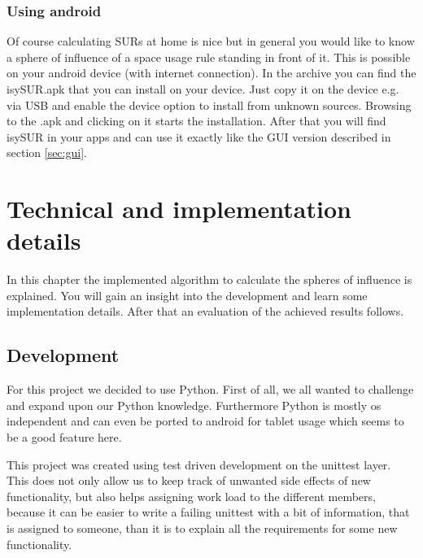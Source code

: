 \documentclass[11pt,fleqn]{book} %
\newcommand{\todol}{\todo[inline]} %
\begin{document}
\subsection{Using android}\label{sec:android}
Of course calculating SURs at home is nice but in general you would like to know a sphere of influence of a space usage rule standing in front of it. This is possible on your android device (with internet connection). In the archive you can find the isySUR.apk that you can install on your device. Just copy it on the device e.g. via USB and enable the device option to install from unknown sources. Browsing to the .apk and clicking on it starts the installation. After that you will find isySUR in your apps and can use it exactly like the GUI version described in section \ref{sec:gui}.


\chapter{Technical and implementation details}
In this chapter the implemented algorithm to calculate the spheres of influence is explained. You will gain an insight into the development and learn some implementation details. After that an evaluation of the achieved results follows.

\todol{Code documentation -> pydoc?}

\section{Development}
For this project we decided to use Python. First of all, we all wanted to challenge and expand upon our Python knowledge. Furthermore Python is mostly os independent and can even be ported to android for tablet usage which seems to be a good feature here.

This project was created using test driven development on the unittest layer. This does not only allow us to keep track of unwanted side effects of new functionality, but also helps assigning work load to the different members, because it can be easier to write a failing unittest with a bit of information, that is assigned to someone, than it is to explain all the requirements for some new functionality.
\end{document}
